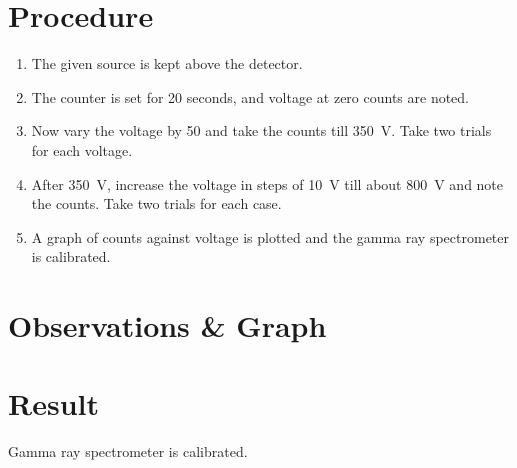 \section{Procedure}
	
	\begin{enumerate}
		\item 	The given source is kept above the detector.
		\item 	The counter is set for 20 seconds, and voltage at zero counts are noted.
		
		\item 	Now vary the voltage by 50 and take the counts till \SI{350}{\volt}. Take two trials for each voltage.
		
		\item 	After \SI{350}{\volt}, increase the voltage in steps of \SI{10}{\volt} till about \SI{800}{\volt} and note the counts. Take two trials for each case.
		
		\item 	A graph of counts against voltage is plotted and the gamma ray spectrometer is calibrated.
		
	\end{enumerate}		


\section{Observations \& Graph}

\section{Result}

Gamma ray spectrometer is calibrated.


